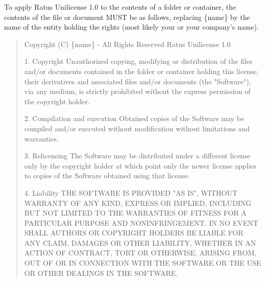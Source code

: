 \documentclass[a4paper,12pt]{article}
\begin{document}
  To apply Ratus Unilicense 1.0 to the contents of a folder or container, the
  contents of the  file or document MUST be as follows,
  replacing \{name\} by the name of the entity holding the rights (most likely
  your or your company's name).

  \begin{quote}
    Copyright (C) \{name\} - All Rights Reserved\newline
    Ratus Unilicense 1.0

    1. Copyright\newline
    Unauthorized copying, modifying or distribution of the files and/or
    documents contained in the folder or container holding this license,
    their derivatives and associated files and/or documents (the "Software"),
    via any medium, is strictly prohibited without the express permission of
    the copyright holder.

    2. Compilation and execution\newline
    Obtained copies of the Software may be compiled and/or executed without
    modification without limitations and warranties.

    3. Relicensing\newline
    The Software may be distributed under a different license only by the
    copyright holder at which point only the newer license applies to copies of
    the Software obtained using that license.

    4. Liability\newline
    THE SOFTWARE IS PROVIDED "AS IS", WITHOUT WARRANTY OF ANY KIND, EXPRESS OR
    IMPLIED, INCLUDING BUT NOT LIMITED TO THE WARRANTIES OF FITNESS FOR A
    PARTICULAR PURPOSE AND NONINFRINGEMENT. IN NO EVENT SHALL AUTHORS OR
    COPYRIGHT HOLDERS BE LIABLE FOR ANY CLAIM, DAMAGES OR OTHER LIABILITY,
    WHETHER IN AN ACTION OF CONTRACT, TORT OR OTHERWISE, ARISING FROM, OUT OF
    OR IN CONNECTION WITH THE SOFTWARE OR THE USE OR OTHER DEALINGS IN THE
    SOFTWARE.

  \end{quote}


\end{document}
